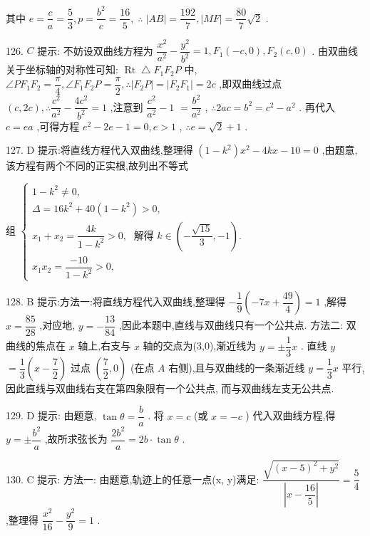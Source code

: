 其中 $e = \dfrac{c}{a} = \dfrac{5}{3},p = \dfrac{{b}^{2}}{c} = \dfrac{16}{5},\;\therefore \;\left| {AB}\right|  = \dfrac{192}{7},\left| {MF}\right|  = \dfrac{80}{7}\sqrt{2}$ .

126. $C$ 提示: 不妨设双曲线方程为 $\dfrac{{x}^{2}}{{a}^{2}} - \dfrac{{y}^{2}}{{b}^{2}} = 1,{F}_{1}\left( {-c,0}\right) ,{F}_{2}\left( {c,0}\right)$ . 由双曲线关于坐标轴的对称性可知: $\operatorname{Rt}\bigtriangleup {F}_{1}{F}_{2}P$ 中, $\angle P{F}_{1}{F}_{2} = \dfrac{\pi }{4},\angle {F}_{1}{F}_{2}P = \dfrac{\pi }{2},\therefore \left| {{F}_{2}P}\right|  = \left| {{F}_{2}{F}_{1}}\right|  = {2c}$ ,即双曲线过点 $\left( {c,{2c}}\right) ,\therefore \dfrac{{c}^{2}}{{a}^{2}} - \dfrac{4{c}^{2}}{{b}^{2}} = 1$ ,注意到 $\dfrac{{c}^{2}}{{a}^{2}} - 1$  $= \dfrac{{b}^{2}}{{a}^{2}}$ , $\therefore {2ac} = {b}^{2} = {c}^{2} - {a}^{2}$ . 再代入 $c = {ea}$ ,可得方程 ${e}^{2} - {2e} - 1 = 0,e > 1$ , $\therefore e = \sqrt{2} + 1$ .

127. D 提示:将直线方程代入双曲线,整理得 $\left( {1 - {k}^{2}}\right) {x}^{2} - {4kx} - {10} = 0$ ,由题意,该方程有两个不同的正实根,故列出不等式

组 $\left\{  \begin{array}{l} 1 - {k}^{2} \neq  0, \\  \Delta  = {16}{k}^{2} + {40}\left( {1 - {k}^{2}}\right)  > 0, \\  {x}_{1} + {x}_{2} = \dfrac{4k}{1 - {k}^{2}} > 0,\;\text{ 解得 }k \in  \left( {-\dfrac{\sqrt{15}}{3}, - 1}\right) . \\  {x}_{1}{x}_{2} = \dfrac{-{10}}{1 - {k}^{2}} > 0, \end{array}\right.$

128. B 提示:方法一:将直线方程代入双曲线,整理得 $- \dfrac{1}{9}\left( {-{7x} + \dfrac{49}{4}}\right)  = 1$ ,解得 $x = \dfrac{85}{28}$ ,对应地, $y =  - \dfrac{13}{84}$ ,因此本题中,直线与双曲线只有一个公共点. 方法二: 双曲线的焦点在 $x$ 轴上,右支与 $x$ 轴的交点为(3,0),渐近线为 $y =  \pm  \dfrac{1}{3}x$ . 直线 $y$  $= \dfrac{1}{3}\left( {x - \dfrac{7}{2}}\right)$ 过点 $\left( {\dfrac{7}{2},0}\right)$ (在点 $A$ 右侧),且与双曲线的一条渐近线 $y = \dfrac{1}{3}x$ 平行,因此直线与双曲线右支在第四象限有一个公共点, 而与双曲线左支无公共点.

129. D 提示: 由题意, $\tan \theta  = \dfrac{b}{a}$ . 将 $x = c$ (或 $x =  - c$ ) 代入双曲线方程,得 $y =  \pm  \dfrac{{b}^{2}}{a}$ ,故所求弦长为 $\dfrac{2{b}^{2}}{a} = {2b} \cdot  \tan \theta$ .

130. C 提示: 方法一: 由题意,轨迹上的任意一点(x, y)满足: $\dfrac{\sqrt{{\left( x - 5\right) }^{2} + {y}^{2}}}{\left| x - \dfrac{16}{5}\right| } = \dfrac{5}{4}$ ,整理得 $\dfrac{{x}^{2}}{16} - \dfrac{{y}^{2}}{9} = 1$ .

